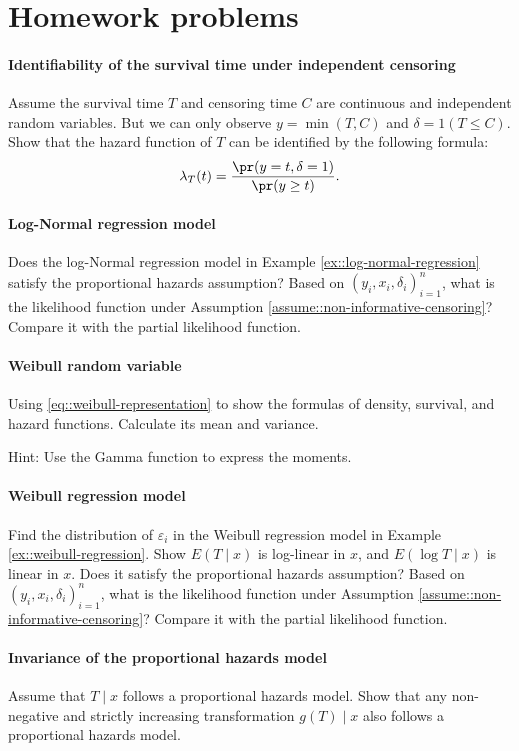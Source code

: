 \section{Homework problems}


\paragraph{Identifiability of the survival time under independent censoring}\label{hw23::identification-km}

Assume the survival time $T$ and censoring time $C$ are continuous and independent random variables. But we can only observe $y = \min(T, C)$ and $\delta = 1(T \leq C)$. Show that the hazard function of $T$ can be identified by the following formula: 
$$
\lambda_T(t) =    \frac{   \pr(y = t, \delta = 1)   }{  \pr(y \geq t)  } . 
$$ 

 
 

\paragraph{Log-Normal regression model}

Does the log-Normal regression model in Example \ref{ex::log-normal-regression} satisfy the proportional hazards assumption?
Based on
$(y_{i},x_{i},\delta_{i})_{i=1}^{n}$, what is the likelihood function under Assumption \ref{assume::non-informative-censoring}? 
Compare it with the partial likelihood function. 


\paragraph{Weibull random variable}
\label{hw23::weibull-rv}

Using \eqref{eq::weibull-representation} to show the formulas of density, survival, and hazard functions. Calculate its mean and variance. 

Hint: Use the Gamma function to express the moments.


\paragraph{Weibull regression model}
\label{hw23::weibull-regression}


Find the distribution of
$\varepsilon_i$ in the Weibull regression model in Example \ref{ex::weibull-regression}. 
Show $E(T \mid x )$ is log-linear in $x$, and $E(\log T \mid x)$ is linear in $x$. 
Does it satisfy the proportional hazards assumption? Based on
$(y_{i},x_{i},\delta_{i})_{i=1}^{n}$, what is the likelihood function under Assumption \ref{assume::non-informative-censoring}? 
Compare it with the partial likelihood function. 

\paragraph{Invariance of the proportional hazards model}\label{hw23::invariance-ph-model}

Assume that $T \mid x$ follows a proportional hazards model. Show
that any non-negative and strictly increasing transformation $g(T)\mid x$ also follows a proportional
hazards model. 


 
 
